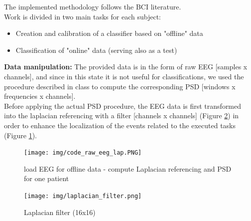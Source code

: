 The implemented methodology follows the BCI literature. \\
Work is divided in two main tasks for each subject: 
\begin{itemize}
\item Creation and calibration of a classifier based on "offline" data
\item Classification of "online" data (serving also as a test)
\end{itemize}\noindent
{\Large \textbf{Data manipulation:}}
The provided data is in the form of raw EEG [samples x channels], and since in this state it is not useful for classifications, we used the procedure described in class to compute the corresponding PSD [windows x frequencies x channels].\\
Before applying the actual PSD procedure, the EEG data is first transformed into the laplacian referencing with a filter [channels x channels] (Figure \ref{fig:laplacian_filter}) in order to enhance the localization of the events related to the executed tasks (Figure \ref{fig:code_raw_eeg_lap}).\\

\begin{figure}[h!]
	\begin{center}
		 \texttt{[image: img/code\_raw\_eeg\_lap.PNG]}
	\end{center}

	 \caption{load EEG for offline data - compute Laplacian referencing and PSD for one patient}
	 \label{fig:code_raw_eeg_lap}
\end{figure}

\begin{figure}[h!]
	\begin{center}
		 \texttt{[image: img/laplacian\_filter.png]}
	\end{center}

	 \caption{Laplacian filter (16x16)}
	 \label{fig:laplacian_filter}
\end{figure}

